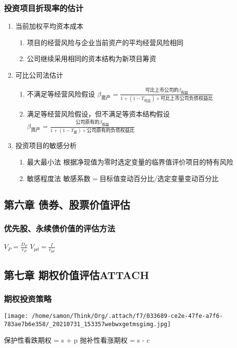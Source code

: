 \documentclass[12pt,a4paper]{article}
\begin{document}
\subsubsection{投资项目折现率的估计}
\label{sec:org2d24023}
\begin{enumerate}
\item 当前加权平均资本成本
\label{sec:orgff8216d}
\begin{enumerate}
\item 项目的经营风险与企业当前资产的平均经营风险相同
\item 公司继续采用相同的资本结构为新项目筹资
\end{enumerate}
\item 可比公司法估计
\label{sec:orgba38bd9}
\begin{enumerate}
\item 不满足等经营风险假设
\label{sec:org4ee9c69}
\(\beta_{资产}=\frac{可比上市公司的\beta_{权益}}{1+(1-T_{可比})\times 可比上市公司负债权益比}\)
\item 满足等经营风险假设，但不满足等资本结构假设
\label{sec:orgdf1c7a6}
\(\beta_{资产}=\frac{公司原有的\beta_{权益}}{1+(1-T_{原})\times 公司原有的负债权益比}\)
\end{enumerate}
\item 投资项目的敏感分析
\label{sec:org3497ff8}
\begin{enumerate}
\item 最大最小法
\label{sec:orgd6a6475}
根据净现值为零时选定变量的临界值评价项目的特有风险
\item 敏感程度法
\label{sec:org1c3c027}
\(敏感系数=目标值变动百分比/选定变量变动百分比\)
\end{enumerate}
\end{enumerate}
\subsection{第六章 债券、股票价值评估}
\label{sec:orge038165}
\subsubsection{优先股、永续债价值的评估方法}
\label{sec:org3c4025e}
\(V_P=\frac{D_P}{r_P}\)
\(V_{pd}=\frac{I}{r_{pd}}\)
\subsection{第七章 期权价值评估\hfill{}\textsc{ATTACH}}
\label{sec:org5d394e3}
\subsubsection{期权投资策略}
\label{sec:orgc0a9f3e}
\begin{center}
\texttt{[image: /home/samon/Think/Org/.attach/f7/033689-ce2e-47fe-a7f6-783ae7b6e358/\_20210731\_153357webwxgetmsgimg.jpg]}
\end{center}
保护性看跌期权 = s + p
抛补性看涨期权 = s - c
\end{document}
